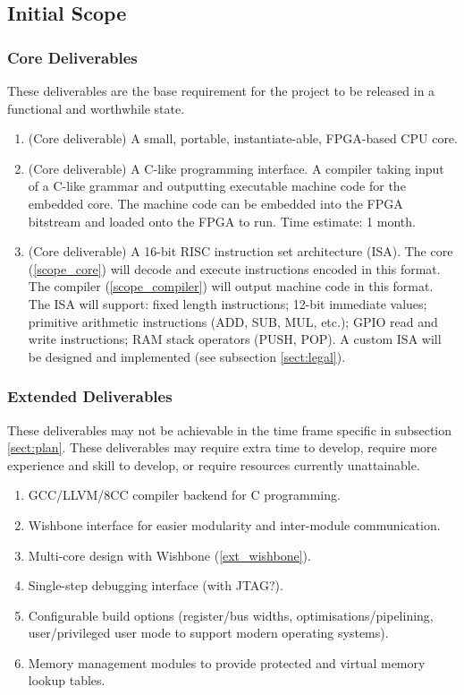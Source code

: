 \subsection*{Initial Scope}
\subsubsection*{Core Deliverables}
These deliverables are the base requirement for the project to be released in a functional and worthwhile state.

\begin{enumerate}[label=\bfseries C\arabic*.]
\item{(Core deliverable) A small, portable, instantiate-able, FPGA-based CPU core.}\label{scope_core}

\item{(Core deliverable) A C-like programming interface. A compiler taking input of a C-like grammar and outputting executable machine code for the embedded core. The machine code can be embedded into the FPGA bitstream and loaded onto the FPGA to run. Time estimate: 1 month.}\label{scope_compiler}

\item{(Core deliverable) A 16-bit RISC instruction set architecture (ISA). The core (\ref{scope_core}) will decode and execute instructions encoded in this format. The compiler (\ref{scope_compiler}) will output machine code in this format. The ISA will support: fixed length instructions; 12-bit immediate values; primitive arithmetic instructions (ADD, SUB, MUL, etc.); GPIO read and write instructions; RAM stack operators (PUSH, POP). A custom ISA will be designed and implemented (see subsection \ref{sect:legal}).
}
\end{enumerate}


\subsubsection*{Extended Deliverables}
These deliverables may not be achievable in the time frame specific in subsection \ref{sect:plan}. These deliverables may require extra time to develop, require more experience and skill to develop, or require resources currently unattainable.

\begin{enumerate}[label=\bfseries E\arabic*.]
\item{GCC/LLVM/8CC compiler backend for C programming.}
\item{Wishbone interface for easier modularity and inter-module communication.}\label{ext_wishbone}
\item{Multi-core design with Wishbone (\ref{ext_wishbone}).}
\item{Single-step debugging interface (with JTAG?).}
\item{Configurable build options (register/bus widths, optimisations/pipelining, user/privileged user mode to support modern operating systems).}
\item{Memory management modules to provide protected and virtual memory lookup tables.}
\end{enumerate}

